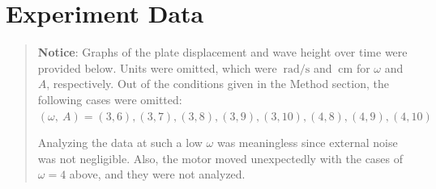 \section{Experiment Data}
\begin{quote}
    \textbf{Notice}: Graphs of the plate displacement and wave height over time were provided below. Units were omitted, which were $\mathrm{~rad/s}$ and $\mathrm{~cm}$ for $\omega$ and $A$, respectively. Out of the conditions given in the Method section, the following cases were omitted: $(\omega, ~A) = (3, 6), (3, 7), (3, 8), (3, 9), (3, 10), (4, 8), (4, 9), (4, 10)$

    Analyzing the data at such a low $\omega$ was meaningless since external noise was not negligible. Also, the motor moved unexpectedly with the cases of $\omega=4$ above, and they were not analyzed.
\end{quote}

